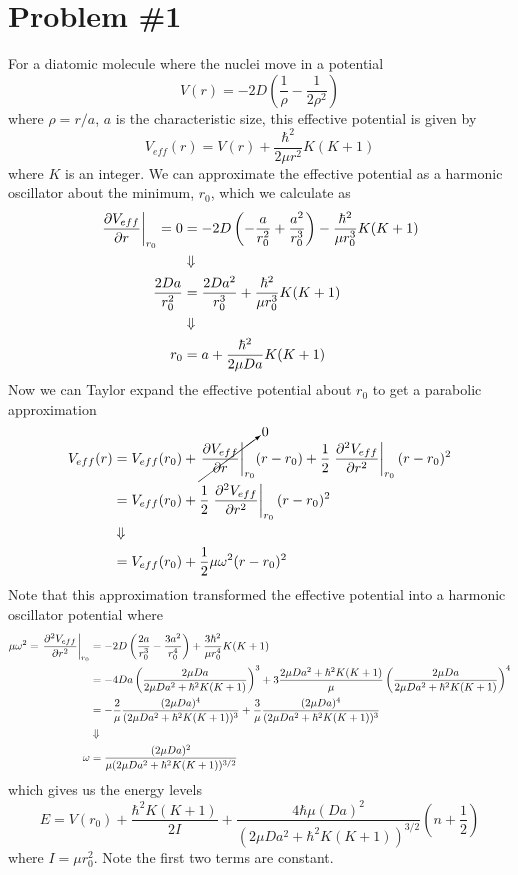 \documentclass[11pt]{article}
\numberwithin{equation}{section}
\begin{document}


\section{Problem \#1}
For a diatomic molecule where the nuclei move in a potential 
$$V(r) = -2D\left(\frac{1}{\rho}-\frac{1}{2\rho^2}\right)$$
where $\rho=r/a$, $a$ is the characteristic size, this effective potential is given by
$$V_{eff}(r) = V(r) + \frac{\hbar^2}{2\mu{r^2}}K(K+1)$$
where $K$ is an integer. We can approximate the effective potential as a harmonic oscillator
about the minimum, $r_0$, which we calculate as
\begin{align*}
\left.\frac{\partial{V_{eff}}}{\partial{r}}\right|_{r_0} = 0 &= -2D\left(-\frac{a}{r_0^2}+\frac{a^2}{r_0^3}\right) - \frac{\hbar^2}{\mu{r_0^3}}K(K+1)\\
&\Downarrow\\
\frac{2Da}{r_0^2} &= \frac{2Da^2}{r_0^3} + \frac{\hbar^2}{\mu{r_0^3}}K(K+1)\\
&\Downarrow\\
r_0 &= a + \frac{\hbar^2}{2\mu{Da}}K(K+1)
\end{align*}
Now we can Taylor expand the effective potential about $r_0$ to get a parabolic approximation
\begin{align*}
V_{eff}(r) &= V_{eff}(r_0) + \cancelto{0}{\left.\frac{\partial{V_{eff}}}{\partial{r}}\right|_{r_0}}(r-r_0) + \frac{1}{2}\left.\frac{\partial{^2V_{eff}}}{\partial{r^2}}\right|_{r_0}(r-r_0)^2\\
&= V_{eff}(r_0)  + \frac{1}{2}\left.\frac{\partial{^2V_{eff}}}{\partial{r^2}}\right|_{r_0}(r-r_0)^2\\
&\Downarrow\\
&= V_{eff}(r_0)  + \frac{1}{2}\mu\omega^2(r-r_0)^2
\end{align*}
Note that this approximation transformed the effective potential into a harmonic oscillator
potential where
\begin{align*}
\mu\omega^2 = \left.\frac{\partial{^2V_{eff}}}{\partial{r^2}}\right|_{r_0} &= -2D\left(\frac{2a}{r_0^3}-\frac{3a^2}{r_0^4}\right) + \frac{3\hbar^2}{\mu{r_0^4}}K(K+1)\\
&= -4Da\left(\frac{2\mu{Da}}{2\mu{Da^2}+\hbar^2K(K+1)}\right)^3 + 3\frac{2\mu{Da^2}+\hbar^2K(K+1)}{\mu}\left(\frac{2\mu{Da}}{2\mu{Da^2}+\hbar^2K(K+1)}\right)^4\\
&= -\frac{2}{\mu}\frac{(2\mu{Da})^4}{(2\mu{Da^2}+\hbar^2K(K+1))^3} + \frac{3}{\mu}\frac{(2\mu{Da})^4}{(2\mu{Da^2}+\hbar^2K(K+1))^3}\\
&\Downarrow\\
\omega &= \frac{(2\mu{Da})^2}{\mu(2\mu{Da^2}+\hbar^2K(K+1))^{3/2}}
\end{align*}
which gives us the energy levels
$$E = V(r_0) + \frac{\hbar^2K(K+1)}{2I} + \frac{4\hbar\mu({Da})^2}{(2\mu{Da^2}+\hbar^2K(K+1))^{3/2}}\left(n+\frac{1}{2}\right)$$
where $I=\mu{r_0^2}$. Note the first two terms are constant.
\end{document}
